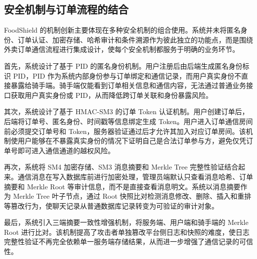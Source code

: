 \subsection{安全机制与订单流程的结合}

FoodShield 的机制创新主要体现在多种安全机制的组合使用。系统并未将匿名身份、订单认证、加密存储、哈希审计和条件溯源作为彼此独立的功能点，而是围绕外卖订单通信流程进行集成设计，使每个安全机制都服务于明确的业务环节。

首先，系统设计了基于 PID 的匿名身份机制。用户注册后由后端生成匿名身份标识 PID，PID 作为系统内部身份参与订单绑定和通信记录，而用户真实身份不直接暴露给骑手端。骑手端仅能看到订单相关信息和通信内容，无法通过普通业务接口获取用户真实身份或 PID，从而降低跨订单关联和身份暴露风险。

其次，系统设计了基于 HMAC-SM3 的订单 Token 认证机制。用户创建订单后，后端将订单号、匿名身份、时间戳等信息绑定生成 Token。用户进入订单通信房间前必须提交订单号和 Token，服务器验证通过后才允许其加入对应订单房间。该机制使用户能够在不暴露真实身份的情况下证明自己是合法订单参与方，避免仅凭订单号即可进入通信通道的越权风险。

再次，系统将 SM4 加密存储、SM3 消息摘要和 Merkle Tree 完整性验证结合起来。通信消息在写入数据库前进行加密处理，管理员端默认只查看消息哈希、订单摘要和 Merkle Root 等审计信息，而不是直接查看消息明文。系统以消息摘要作为 Merkle Tree 叶子节点，通过 Root 快照比对检测消息修改、删除、插入和重排等篡改行为，使聊天记录从普通数据库记录转变为可验证的审计对象。

最后，系统引入三端摘要一致性增强机制，将服务端、用户端和骑手端的 Merkle Root 进行比对。该机制提高了攻击者单独篡改平台侧日志和快照的难度，使日志完整性验证不再完全依赖单一服务端存储结果，从而进一步增强了通信记录的可信性。
